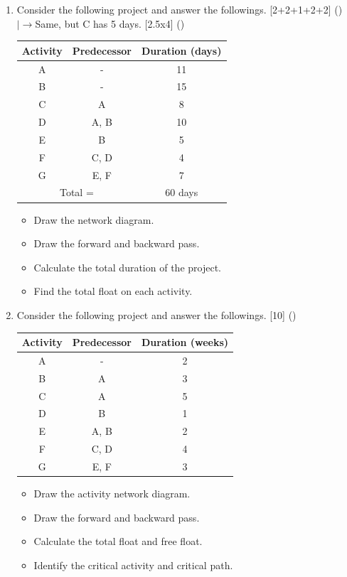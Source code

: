 \documentclass[12pt]{article}
\newcommand{\lb}{\\$\left|\rightarrow\right.$}
\begin{document}
\begin{enumerate}
      \item Consider the following project and answer the followings. \hfill [2+2+1+2+2] ()
        \lb Same, but C has 5 days. \hfill [2.5x4] ()\\
        \begin{tabular}{|c|c|c|}
          \hline
          Activity & Predecessor & Duration (days)\\ \hline
          A & - & 11 \\ \hline
          B & - & 15 \\ \hline
          C & A & 8 \\ \hline
          D & A, B & 10 \\ \hline
          E & B & 5 \\ \hline
          F & C, D & 4 \\ \hline
          G & E, F & 7 \\ \hline
          \multicolumn{2}{|c|}{Total =} & 60 days \\ \hline
        \end{tabular}
        \begin{itemize}[noitemsep]
          \item Draw the network diagram.
          \item Draw the forward and backward pass.
          \item Calculate the total duration of the project.
          \item Find the total float on each activity.
        \end{itemize}

      \item Consider the following project and answer the followings. \hfill [10] ()\\
        \begin{tabular}{|c|c|c|}
          \hline
          Activity & Predecessor & Duration (weeks)\\ \hline
          A & - & 2 \\ \hline
          B & A & 3 \\ \hline
          C & A & 5 \\ \hline
          D & B & 1 \\ \hline
          E & A, B & 2 \\ \hline
          F & C, D & 4 \\ \hline
          G & E, F & 3 \\ \hline
        \end{tabular}
        \begin{itemize}[noitemsep]
          \item Draw the activity network diagram.
          \item Draw the forward and backward pass.
          \item Calculate the total float and free float.
          \item Identify the critical activity and critical path.
        \end{itemize}


\end{enumerate}
\end{document}
